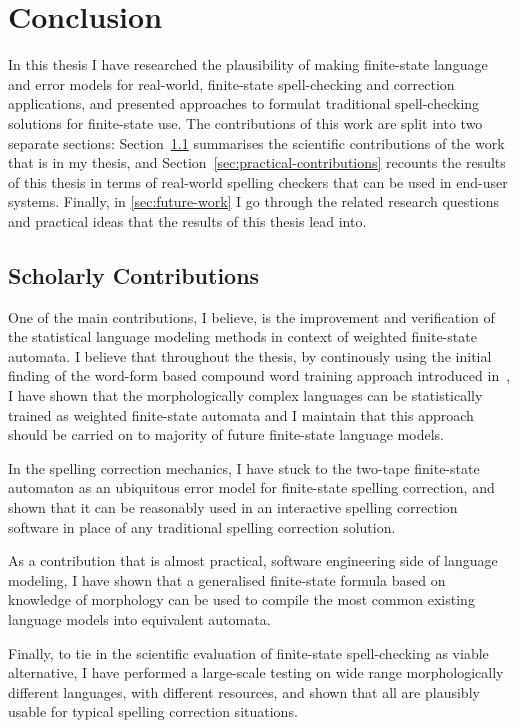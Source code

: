 \documentclass[officiallayout]{unihelcompling}
\begin{document}
\chapter{Conclusion}
\label{chap:conclusion}

In this thesis I have researched the plausibility of making finite-state
language and error models for real-world, finite-state spell-checking and
correction applications, and presented approaches to formulat traditional
spell-checking solutions for finite-state use. The contributions of this work
are split into two separate sections: Section~\ref{sec:scholarly-contributions}
summarises the scientific contributions of the work that is in my thesis, and
Section~\ref{sec:practical-contributions} recounts the results of this thesis
in terms of real-world spelling checkers that can be used in end-user systems.
Finally, in \ref{sec:future-work} I go through the related research questions
and practical ideas that the results of this thesis lead into.

\section{Scholarly Contributions}
\label{sec:scholarly-contributions}

One of the main contributions, I believe, is the improvement and verification
of the statistical language modeling methods in context of weighted 
finite-state automata. I believe that throughout the thesis, by continously
using the initial finding of the word-form based compound word training
approach introduced in~, I have shown that the
morphologically complex languages can be statistically trained as weighted
finite-state automata and I maintain that this approach should be carried on
to majority of future finite-state language models.

In the spelling correction mechanics, I have stuck to the two-tape finite-state
automaton as an ubiquitous error model for finite-state spelling correction,
and shown that it can be reasonably used in an interactive spelling correction
software in place of any traditional spelling correction solution.

As a contribution that is almost practical, software engineering side of
language modeling, I have shown that a generalised finite-state formula based
on knowledge of morphology can be used to compile the most common existing
language models into equivalent automata.

Finally, to tie in the scientific evaluation of finite-state spell-checking as
viable alternative, I have performed a large-scale testing on wide range
morphologically different languages, with different resources, and shown that
all are plausibly usable for typical spelling correction situations.
\end{document}
